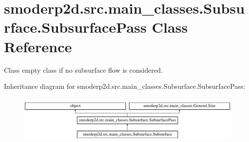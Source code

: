 \hypertarget{classsmoderp2d_1_1src_1_1main__classes_1_1Subsurface_1_1SubsurfacePass}{\section{smoderp2d.\-src.\-main\-\_\-classes.\-Subsurface.\-Subsurface\-Pass Class Reference}
\label{classsmoderp2d_1_1src_1_1main__classes_1_1Subsurface_1_1SubsurfacePass}
}


Class empty class if no subsurface flow is considered.  


Inheritance diagram for smoderp2d.\-src.\-main\-\_\-classes.\-Subsurface.\-Subsurface\-Pass\-:\begin{figure}[H]
\begin{center}
\leavevmode
\includegraphics[height=2.413793cm]{classsmoderp2d_1_1src_1_1main__classes_1_1Subsurface_1_1SubsurfacePass}
\end{center}
\end{figure}
